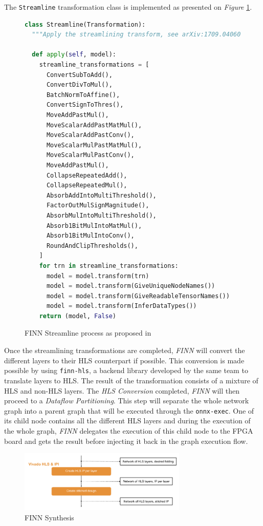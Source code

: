 The \texttt{Streamline} transformation class is implemented as presented on \emph{Figure} \ref{fig:FINNStreamline}.

\begin{figure}[htbp]
\centering
\begin{lstlisting}[language=Python]
class Streamline(Transformation):
  """Apply the streamlining transform, see arXiv:1709.04060."""

  def apply(self, model):
    streamline_transformations = [
      ConvertSubToAdd(),
      ConvertDivToMul(),
      BatchNormToAffine(),
      ConvertSignToThres(),
      MoveAddPastMul(),
      MoveScalarAddPastMatMul(),
      MoveScalarAddPastConv(),
      MoveScalarMulPastMatMul(),
      MoveScalarMulPastConv(),
      MoveAddPastMul(),
      CollapseRepeatedAdd(),
      CollapseRepeatedMul(),
      AbsorbAddIntoMultiThreshold(),
      FactorOutMulSignMagnitude(),
      AbsorbMulIntoMultiThreshold(),
      Absorb1BitMulIntoMatMul(),
      Absorb1BitMulIntoConv(),
      RoundAndClipThresholds(),
    ]
    for trn in streamline_transformations:
      model = model.transform(trn)
      model = model.transform(GiveUniqueNodeNames())
      model = model.transform(GiveReadableTensorNames())
      model = model.transform(InferDataTypes())
    return (model, False)
\end{lstlisting}
\caption[FINN Streamline]{FINN Streamline process as proposed in \cite{Blott2018}}
	\label{fig:FINNStreamline}
\end{figure}


Once the streamlining transformations are completed, \emph{FINN} will convert the different layers to their HLS counterpart if possible. This conversion is made possible by using \texttt{finn-hls}, a backend library developed by the same team to translate layers to HLS. The result of the transformation consists of a mixture of HLS and non-HLS layers. The \emph{HLS Conversion} completed, \emph{FINN} will then proceed to a \emph{Dataflow Partitioning}. This step will separate the whole network graph into a parent graph that will be executed through the \texttt{onnx-exec}. One of its child node contains all the different HLS layers and during the execution of the whole graph, \emph{FINN} delegates the execution of this child node to the FPGA board and gets the result before injecting it back in the graph execution flow.

\begin{figure}[htbp]
	\centering
		\includegraphics[width=8cm]{Figures/FINNSynthesis.png}
	\caption[FINN Synthesis]{FINN Synthesis}
	\label{fig:FINNSynthesis}
\end{figure}

